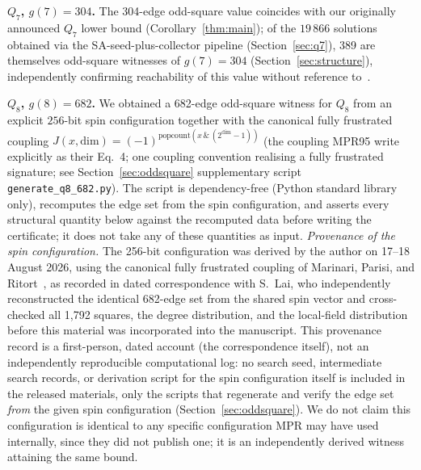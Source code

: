 \documentclass[12pt,a4paper]{article}
\theoremstyle{definition}
\begin{document}
\textbf{$Q_7$, $g(7)=304$.} The 304-edge odd-square value coincides with our
originally announced $Q_7$ lower bound (Corollary~\ref{thm:main}); of the
$19\,866$ solutions obtained via the SA-seed-plus-collector pipeline (Section~\ref{sec:q7}),
389 are themselves odd-square witnesses of $g(7)=304$
(Section~\ref{sec:structure}), independently confirming reachability of this
value without reference to~\cite{DPTV79}.

\textbf{$Q_8$, $g(8)=682$.} We obtained a 682-edge odd-square witness
for $Q_8$ from an explicit $256$-bit spin configuration together with the
canonical fully frustrated coupling
$J(x,\mathrm{dim})=(-1)^{\mathrm{popcount}(x\,\&\,(2^{\mathrm{dim}}-1))}$
(the coupling MPR95 write explicitly as their Eq.~4;
one coupling convention realising a fully frustrated signature; see
Section~\ref{sec:oddsquare} supplementary script \texttt{generate\_q8\_682.py}).
The script is dependency-free (Python standard library only),
recomputes the edge set from the spin configuration, and asserts every
structural quantity below against the recomputed data before writing the
certificate; it does not take any of these quantities as input.
\emph{Provenance of the spin configuration.} The 256-bit configuration
was derived by the author on 17--18 August 2026, using the canonical
fully frustrated coupling of Marinari, Parisi, and Ritort~\cite{MPR95},
as recorded in dated correspondence with S.~Lai, who independently
reconstructed the identical 682-edge set from the shared spin vector and
cross-checked all 1,792 squares, the degree distribution, and the
local-field distribution before this material was incorporated into the
manuscript. This provenance record is a first-person, dated account
(the correspondence itself), not an independently reproducible
computational log: no search seed, intermediate search records, or
derivation script for the spin configuration itself is included in the
released materials, only the scripts that regenerate and verify the
edge set \emph{from} the given spin configuration
(Section~\ref{sec:oddsquare}). We do not claim this configuration is
identical to any specific configuration MPR may have used internally,
since they did not publish one; it is an independently derived witness
attaining the same bound.
\end{document}
